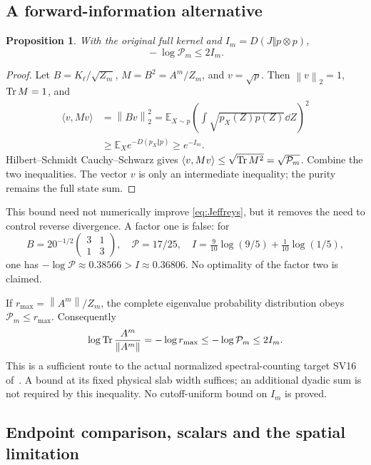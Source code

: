 \documentclass[11pt,letterpaper]{article}
\newtheorem{proposition}[theorem]{Proposition}
\theoremstyle{remark}\newtheorem{remark}[theorem]{Remark}
\newcommand{\E}{\mathbb E}
\newcommand{\norm}[1]{\left\lVert#1\right\rVert}
\begin{document}
\subsection{A forward-information alternative}

\begin{proposition}\label{prop:information}
With the original full kernel and \(I_m=D(J\Vert p\otimes p)\),
\begin{equation}\label{eq:2I}
 \boxed{\quad -\log\mathcal P_m\le2I_m.\quad}
\end{equation}
\end{proposition}
\begin{proof}
Let \(B=K_\ell/\sqrt{Z_m}\), \(M=B^2=A^m/Z_m\), and \(v=\sqrt p\). Then \(\norm v_2=1\), \(\operatorname{Tr} M=1\), and
\begin{align*}
 \langle v,Mv\rangle
 &=\norm{Bv}_2^2
 =\E_{X\sim p}\left(\int\sqrt{p_X(Z)p(Z)}\dd Z\right)^2\\
 &\ge\E_Xe^{-D(p_X\Vert p)}\ge e^{-I_m}.
\end{align*}
Hilbert--Schmidt Cauchy--Schwarz gives
\(\langle v,Mv\rangle\le\sqrt{\operatorname{Tr} M^2}=\sqrt{\mathcal P_m}\). Combine the two inequalities. The vector \(v\) is only an intermediate inequality; the purity remains the full state sum.
\end{proof}

This bound need not numerically improve \eqref{eq:Jeffreys}, but it removes the need to control reverse divergence. A factor one is false: for
\[
 B=20^{-1/2}\begin{pmatrix}3&1\\1&3\end{pmatrix},\quad
 \mathcal P=17/25,\quad
 I=\tfrac9{10}\log(9/5)+\tfrac1{10}\log(1/5),
\]
one has \(-\log\mathcal P\approx0.38566>I\approx0.36806\). No optimality of the factor two is claimed.

If \(r_{\max}=\norm{A^m}/Z_m\), the complete eigenvalue probability distribution obeys \(\mathcal P_m\le r_{\max}\). Consequently
\begin{equation}\label{eq:SV16}
 \log\Tr\frac{A^m}{\norm{A^m}}
 =-\log r_{\max}\le-\log\mathcal P_m\le2I_m.
\end{equation}
This is a sufficient route to the actual normalized spectral-counting target SV16 of~\cite[p.~633]{W}. A bound at its fixed physical slab width suffices; an additional dyadic sum is not required by this inequality. No cutoff-uniform bound on \(I_m\) is proved.

\subsection{Endpoint comparison, scalars and the spatial limitation}
\end{document}
